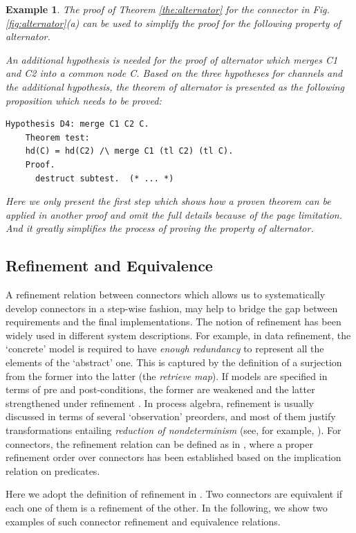 \documentclass[3p,times]{elsarticle}
\newtheorem{example}{Example}[section]
\begin{document}
\begin{example}
The proof of Theorem \ref{the:alternator} for the connector in Fig. \ref{fig:alternator}(a) can be used to simplify the proof for the following
property of alternator.

An additional hypothesis is needed for the proof of alternator which merges \emph{C1} and \emph{C2} into a common node \emph{C}. Based on the three
hypotheses for channels and the additional hypothesis, the theorem of alternator is presented as the following proposition which needs to be proved:
\begin{lstlisting}[language=coq]
    Hypothesis D4: merge C1 C2 C.
    Theorem test:
    hd(C) = hd(C2) /\ merge C1 (tl C2) (tl C).
    Proof.
      destruct subtest.  (* ... *)
\end{lstlisting}
Here we only present the first step which shows how a proven theorem can be applied in another proof and omit the full details because of the page limitation.
And it greatly simplifies the process of proving the property of alternator.
\end{example}

\subsection{Refinement and Equivalence}

A refinement relation between connectors which allows us to systematically develop connectors in a step-wise fashion, may help to bridge
the gap between requirements and the final implementations. The notion of refinement has been widely used in different system descriptions.
For example, in data refinement\cite{RE98}, the `concrete' model is required to have \emph{enough redundancy} to represent all the elements
of the `abstract' one. This is captured by the definition of a surjection from the former into the latter (the \emph{retrieve map}). If
models are specified in terms of pre and post-conditions, the former are weakened and the latter strengthened under refinement \cite{Jon90}.
In process algebra, refinement is usually discussed in terms of several `observation' preorders, and most of them justify
transformations entailing \emph{reduction of nondeterminism} (see, for
example, \cite{Ros98}). For connectors, the refinement relation can be
defined as in \cite{SAA+12}, where a proper refinement order over
connectors has been established based on the implication relation on
predicates.

Here we adopt the definition of refinement in \cite{SAA+12}. Two connectors are equivalent if each one of them is a refinement of the other.
In the following, we show two examples of such connector refinement and equivalence relations.
\end{document}
